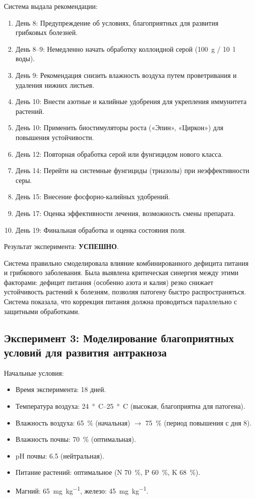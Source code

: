 Система выдала рекомендации:
\begin{enumerate}
    \item День 8: Предупреждение об условиях, благоприятных для развития грибковых болезней.
    \item День 8--9: Немедленно начать обработку коллоидной серой (\SI{100}{\gram} / \SI{10}{\litre} воды).
    \item День 9: Рекомендация снизить влажность воздуха путем проветривания и удаления нижних листьев.
    \item День 10: Внести азотные и калийные удобрения для укрепления иммунитета растений.
    \item День 10: Применить биостимуляторы роста («Эпин», «Циркон») для повышения устойчивости.
    \item День 12: Повторная обработка серой или фунгицидом нового класса.
    \item День 14: Перейти на системные фунгициды (триазолы) при неэффективности серы.
    \item День 15: Внесение фосфорно-калийных удобрений.
    \item День 17: Оценка эффективности лечения, возможность смены препарата.
    \item День 19: Финальная обработка и оценка состояния поля.
\end{enumerate}

Результат эксперимента: \textbf{УСПЕШНО}.

Система правильно смоделировала влияние комбинированного дефицита питания и грибкового заболевания. Была выявлена критическая синергия между этими факторами: дефицит питания (особенно азота и калия) резко снижает устойчивость растений к болезням, позволяя патогену быстро распространяться. Система показала, что коррекция питания должна проводиться параллельно с защитными обработками.

\subsection{Эксперимент 3: Моделирование благоприятных условий для развития антракноза}

Начальные условия:
\begin{itemize}
    \item Время эксперимента: \num{18} дней.
    \item Температура воздуха: \SIrange{24}{25}{\degree C} (высокая, благоприятна для патогена).
    \item Влажность воздуха: \SI{65}{\percent} (начальная) $\to$ \SI{75}{\percent} (период повышения с дня \num{8}).
    \item Влажность почвы: \SI{70}{\percent} (оптимальная).
    \item pH почвы: \num{6.5} (нейтральная).
    \item Питание растений: оптимальное (N \SI{70}{\percent}, P \SI{60}{\percent}, K \SI{68}{\percent}).
    \item Магний: \SI{65}{\milli\gram\per\kilogram}, железо: \SI{45}{\milli\gram\per\kilogram}.
\end{itemize}


